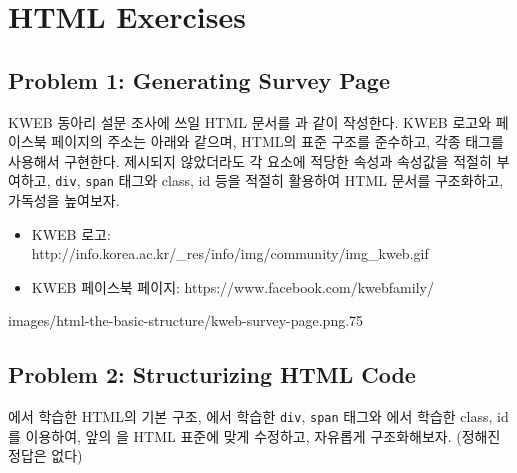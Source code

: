 \section{HTML Exercises} \label{sect:html-exercises}

\subsection*{Problem 1: Generating Survey Page}

KWEB 동아리 설문 조사에 쓰일 HTML 문서를 과 같이 작성한다. KWEB 로고와 페이스북 페이지의 주소는 아래와 같으며, HTML의 표준 구조를 준수하고, 각종 태그를 사용해서 구현한다. 제시되지 않았더라도 각 요소에 적당한 속성과 속성값을 적절히 부여하고, \texttt{div}, \texttt{span} 태그와 class, id 등을 적절히 활용하여 HTML 문서를 구조화하고, 가독성을 높여보자.

\begin{itemize}
    \item KWEB 로고: http://info.korea.ac.kr/\_res/info/img/community/img\_kweb.gif
    \item KWEB 페이스북 페이지: https://www.facebook.com/kwebfamily/
\end{itemize}

    {images/html-the-basic-structure/kweb-survey-page.png}{.75}

\subsection*{Problem 2: Structurizing HTML Code}

에서 학습한 HTML의 기본 구조, 에서 학습한 \texttt{div}, \texttt{span} 태그와 에서 학습한 class, id를 이용하여, 앞의 을 HTML 표준에 맞게 수정하고, 자유롭게 구조화해보자. (정해진 정답은 없다) 
